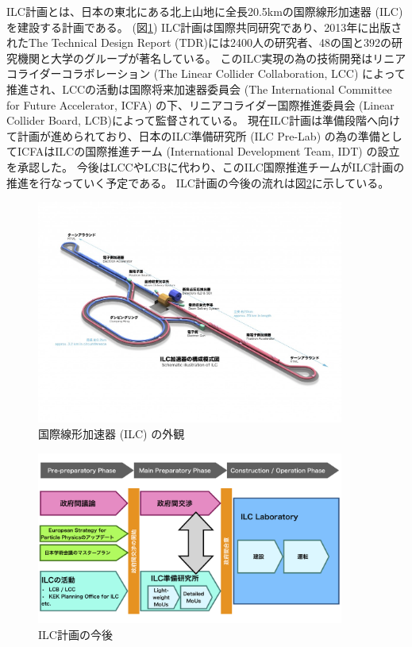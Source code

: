 ILC計画とは、日本の東北にある北上山地に全長20.5kmの国際線形加速器 (ILC) を建設する計画である。 (図\ref{2InternationalLinearCollider})
ILC計画は国際共同研究であり、2013年に出版されたThe Technical Design Report (TDR)には2400人の研究者、48の国と392の研究機関と大学のグループが著名している。
このILC実現の為の技術開発はリニアコライダーコラボレーション (The Linear Collider Collaboration, LCC) によって推進され、LCCの活動は国際将来加速器委員会 (The International Committee for Future Accelerator, ICFA) の下、リニアコライダー国際推進委員会 (Linear Collider Board, LCB)によって監督されている。
現在ILC計画は準備段階へ向けて計画が進められており、日本のILC準備研究所 (ILC Pre-Lab) の為の準備としてICFAはILCの国際推進チーム (International Development Team, IDT) の設立を承認した。
今後はLCCやLCBに代わり、このILC国際推進チームがILC計画の推進を行なっていく予定である。
ILC計画の今後の流れは図\ref{3ILCProject}に示している。

\begin{figure}[htbp]
 \centering
  \includegraphics[width=0.9\textwidth]{Figure/1Introduction/2InternationalLinearCollider.jpg}
  \caption{国際線形加速器 (ILC) の外観\cite{ILCPHOTO}}
  \label{2InternationalLinearCollider}
\end{figure}


\begin{figure}[htbp]
 \centering
 \includegraphics[width=0.9\textwidth]{Figure/1Introduction/3ILCProject.png}
 \caption{ILC計画の今後\cite{RecommendationsonILCProjectImplementation}}
 \label{3ILCProject}
\end{figure}

